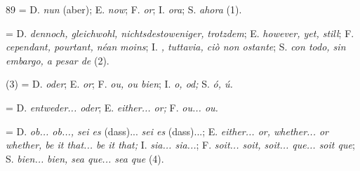 \begin{VUpage}[93]{89}
 = D. \textit{nun} (aber); E. \textit{now}; F. \textit{or}; I. \textit{ora}; S. \textit{ahora} (1).

 = D. \textit{dennoch, gleichwohl, nichtsdestoweniger,}\nl
\textit{trotzdem}; E. \textit{however, yet, still}; F. \textit{cependant, pourtant, néan}\cc
\textit{moins}; I. \textit{, tuttavia, ciò non ostante}; S. \textit{con todo, sin}\nl
\textit{embargo, a pesar de} (2).

 (3) = D. \textit{oder}; E. \textit{or}; F. \textit{ou, ou bien}; I. \textit{o, od;}\nl
S. \textit{ó, ú.}

 = D. \textit{entweder... oder}; E. \textit{either... or;}\nl
F. \textit{ou... ou.}

 = D. \textit{ob... ob..., sei es} (dass)... \textit{sei es} (dass)...;\nl
E. \textit{either... or, whether... or whether, be it that... be it that;}\nl
I. \textit{sia... sia...}; F. \textit{soit... soit, soit... que... soit que}; S. \textit{bien...}\nl
\textit{bien, sea que... sea que} (4).
\end{VUpage}

